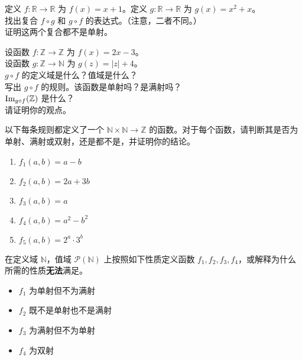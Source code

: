 \begin{exercise}
    定义 $f : \mathbb{R} \to \mathbb{R}$ 为 $f(x) = x + 1$。定义 $g : \mathbb{R} \to \mathbb{R}$ 为 $g(x) = x^2 + x$。\\
    找出复合 $f \circ g$ 和 $g \circ f$ 的表达式。（注意，二者不同。）\\
    证明这两个复合都不是单射。
\end{exercise}

\begin{exercise}
    设函数 $f : \mathbb{Z} \to \mathbb{Z}$ 为 $f(x) = 2x - 3$。\\
    设函数 $g : \mathbb{Z} \to \mathbb{N}$ 为 $g(z) = |z| + 4$。\\
    $g \circ f$ 的定义域是什么？值域是什么？\\
    写出 $g \circ f$ 的规则。该函数是单射吗？是满射吗？\\
    $\text{Im}_{g \circ f}(\mathbb{Z})$ 是什么？\\
    请证明你的观点。
\end{exercise}

\begin{exercise}
    以下每条规则都定义了一个 $\mathbb{N} \times \mathbb{N} \to \mathbb{Z}$ 的函数。对于每个函数，请判断其是否为单射、满射或双射，还是都不是，并证明你的结论。
    \begin{enumerate}[label=(\alph*)]
        \item $f_1(a, b) = a - b$
        \item $f_2(a, b) = 2a + 3b$
        \item $f_3(a, b) = a$
        \item $f_4(a, b) = a^2 - b^2$
        \item $f_5(a, b) = 2^a \cdot 3^b$
    \end{enumerate}
\end{exercise}

\begin{exercise}
    在定义域 $\mathbb{N}$，值域 $\mathcal{P}(\mathbb{N})$ 上按照如下性质定义函数 $f_1, f_2, f_3, f_4$，或解释为什么所需的性质\textbf{无法}满足。
    \begin{itemize}
        \item $f_1$ 为单射但不为满射
        \item $f_2$ 既不是单射也不是满射
        \item $f_3$ 为满射但不为单射
        \item $f_4$ 为双射
    \end{itemize}
\end{exercise}

